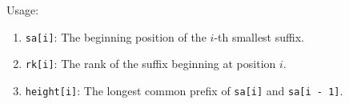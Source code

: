 Usage:
\begin{enumerate}
\item \texttt{sa[i]}: The beginning position of the $i$-th smallest suffix.
\item \texttt{rk[i]}: The rank of the suffix beginning at position $i$.
\item \texttt{height[i]}: The longest common prefix of \texttt{sa[i]} and \texttt{sa[i - 1]}.
\end{enumerate}


